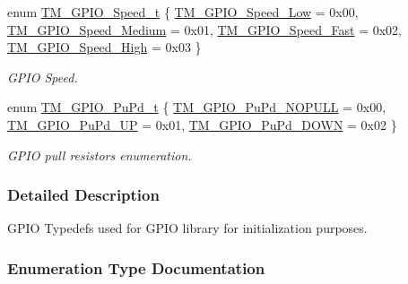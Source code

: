\begin{DoxyCompactItemize}
enum \hyperlink{group___t_m___g_p_i_o___typedefs_gaa57736d106efbe14067be22025f296c4}{T\+M\+\_\+\+G\+P\+I\+O\+\_\+\+Speed\+\_\+t} \{ \hyperlink{group___t_m___g_p_i_o___typedefs_ggaa57736d106efbe14067be22025f296c4a20d05d373e1340842eceec7760ac369d}{T\+M\+\_\+\+G\+P\+I\+O\+\_\+\+Speed\+\_\+\+Low} = 0x00, 
\hyperlink{group___t_m___g_p_i_o___typedefs_ggaa57736d106efbe14067be22025f296c4aa566a49f42b266b30db1a52563bfbd8c}{T\+M\+\_\+\+G\+P\+I\+O\+\_\+\+Speed\+\_\+\+Medium} = 0x01, 
\hyperlink{group___t_m___g_p_i_o___typedefs_ggaa57736d106efbe14067be22025f296c4ada5e219c39bf024f3bbe49506e67f980}{T\+M\+\_\+\+G\+P\+I\+O\+\_\+\+Speed\+\_\+\+Fast} = 0x02, 
\hyperlink{group___t_m___g_p_i_o___typedefs_ggaa57736d106efbe14067be22025f296c4ad6747b6108c911e7c9d7f6d0e8c963df}{T\+M\+\_\+\+G\+P\+I\+O\+\_\+\+Speed\+\_\+\+High} = 0x03
 \}
\begin{DoxyCompactList}\small\item\em G\+P\+I\+O Speed. \end{DoxyCompactList}\item 
enum \hyperlink{group___t_m___g_p_i_o___typedefs_ga50ddb0da56d8a388dee368c55e968602}{T\+M\+\_\+\+G\+P\+I\+O\+\_\+\+Pu\+Pd\+\_\+t} \{ \hyperlink{group___t_m___g_p_i_o___typedefs_gga50ddb0da56d8a388dee368c55e968602a6efe40eb21f3c2293447c9435ffee2e1}{T\+M\+\_\+\+G\+P\+I\+O\+\_\+\+Pu\+Pd\+\_\+\+N\+O\+P\+U\+L\+L} = 0x00, 
\hyperlink{group___t_m___g_p_i_o___typedefs_gga50ddb0da56d8a388dee368c55e968602a5b672ef3d371a292b13edd4e357ef80f}{T\+M\+\_\+\+G\+P\+I\+O\+\_\+\+Pu\+Pd\+\_\+\+U\+P} = 0x01, 
\hyperlink{group___t_m___g_p_i_o___typedefs_gga50ddb0da56d8a388dee368c55e968602a5cb8e93ea6abd639ba7efaf9b37f3bd8}{T\+M\+\_\+\+G\+P\+I\+O\+\_\+\+Pu\+Pd\+\_\+\+D\+O\+W\+N} = 0x02
 \}
\begin{DoxyCompactList}\small\item\em G\+P\+I\+O pull resistors enumeration. \end{DoxyCompactList}\end{DoxyCompactItemize}


\subsubsection{Detailed Description}
G\+P\+I\+O Typedefs used for G\+P\+I\+O library for initialization purposes. 



\subsubsection{Enumeration Type Documentation}
\hypertarget{group___t_m___g_p_i_o___typedefs_gacbb363a57d0e70ea563e494eff1db3ca}{}
